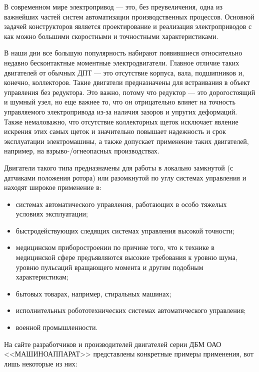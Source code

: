 \intro

В современном мире электропривод — это, без преувеличения, одна из важнейших частей 
систем автоматизации производственных процессов. Основной задачей конструкторов
является проектирование и реализация электроприводов с как можно большими скоростными
и точностными характеристиками. 

В наши дни все большую популярность набирают появившиеся 
относительно недавно бесконтактные моментные электродвигатели. 
Главное отличие таких двигателей от обычных ДПТ — это отсутствие корпуса, 
вала, подшипников и, конечно, коллекторов. Такие двигатели предназначены для 
встраивания в объект управления без редуктора. Это важно, потому что редуктор — 
это дорогостоящий и шумный узел, но еще важнее то, что он отрицательно влияет 
на точность управляемого электропривода из-за наличия зазоров и 
упругих деформаций. Также немаловажно, что отсутствие коллекторных щеток исключает явление искрения
этих самых щеток и значительно повышает надежность и срок эксплуатации электромашины, а
также допускает применение таких двигателей, например, на взрыво-/огнеопасных производствах.

Двигатели такого типа предназначены для работы в локально замкнутой (с датчиками положения ротора) 
или разомкнутой по углу системах управления и находят широкое применение в:

\begin{itemize}
  \item системах автоматического управления, работающих в особо 
    тяжелых условиях эксплуатации;

  \item быстродействующих следящих системах управления высокой точности;

  \item медицинском приборостроении по причине того, что к технике в медицинской сфере
    предъявляются высокие требования к уровню шума, уровню пульсаций 
    вращающего момента и другим подобным характеристикам;
  
  \item бытовых товарах, например, стиральных машинах;
  
  \item исполнительных робототехнических системах автоматического управления;
  
  \item военной промышленности.
\end{itemize}

На сайте \cite{Машиноаппарат} разработчиков и производителей двигателей серии ДБМ ОАО <<МАШИНОАППАРАТ>> 
представлены конкретные примеры применения, вот лишь некоторые из них:

